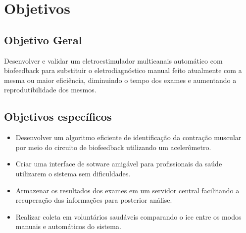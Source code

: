 \section{Objetivos}

\subsection{Objetivo Geral}
Desenvolver e validar um eletroestimulador multicanais automático com biofeedback para substituir o eletrodiagnóstico manual feito atualmente com a mesma ou maior eficiência, diminuindo o tempo dos exames e aumentando a reprodutibilidade dos mesmos.
\subsection{Objetivos específicos}
\begin{itemize}
  \item Desenvolver um algoritmo eficiente de identificação da contração muscular por meio do circuito de biofeedback utilizando um acelerômetro.
  \item Criar uma interface de sotware amigável para profissionais da saúde utilizarem o sistema sem dificuldades.
  \item Armazenar os resultados dos exames em um servidor central facilitando a recuperação das informações para posterior análise.
  \item Realizar coleta em voluntários saudáveis comparando o \ac{icc} entre os modos manuais e automáticos do sistema.
\end{itemize}